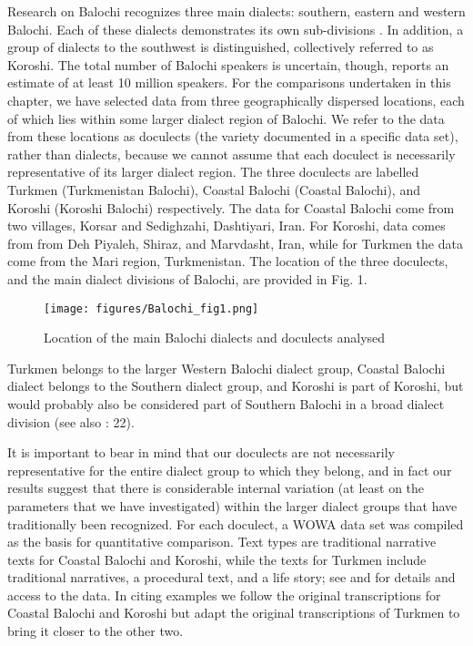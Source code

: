 \documentclass[output=paper,colorlinks,citecolor=brown,draftmode]{langscibook}
\begin{document}
Research on Balochi recognizes three main dialects: southern, eastern and western Balochi. Each of these dialects demonstrates its own sub-divisions \citep[see][636--637]{jahani_balochi_2009}. In addition, a group of dialects to the southwest is distinguished, collectively referred to as Koroshi. The total number of Balochi speakers is uncertain, though, \citet{jahani_balochi_2013} reports an estimate of at least 10 million speakers. For the comparisons undertaken in this chapter, we have selected data from three geographically dispersed locations, each of which lies within some larger dialect region of Balochi. We refer to the data from these locations as doculects (the variety documented in a specific data set), rather than dialects, because we cannot assume that each doculect is necessarily representative of its larger dialect region. The three doculects are labelled Turkmen (Turkmenistan Balochi), Coastal Balochi (Coastal Balochi), and Koroshi (Koroshi Balochi) respectively. The data for Coastal Balochi come from two villages, Korsar and Sedighzahi, Dashtiyari, Iran. For Koroshi, data comes from from Deh Piyaleh, Shiraz, and Marvdasht, Iran, while for Turkmen the data come from the Mari region, Turkmenistan. The location of the three doculects, and the main dialect divisions of Balochi, are provided in Fig. 1.

\begin{figure}
 \centering
 \texttt{[image: figures/Balochi\_fig1.png]}
 \caption{Location of the main Balochi dialects and doculects analysed}
 \label{Balochi:fig:1}
\end{figure}

Turkmen belongs to the larger Western Balochi dialect group, Coastal Balochi dialect belongs to the Southern dialect group, and Koroshi is part of Koroshi, but would probably also be considered part of Southern Balochi in a broad dialect division (see also \citealt{nourzaei_koroshi_2015}: 22). 

It is important to bear in mind that our doculects are not necessarily representative for the entire dialect group to which they belong, and in fact our results suggest that there is considerable internal variation (at least on the  parameters that we have investigated) within the larger dialect groups that have traditionally been recognized. For each doculect, a WOWA data set was compiled as the basis for quantitative comparison. Text types are traditional narrative texts for Coastal Balochi and Koroshi, while the texts for Turkmen include traditional narratives, a procedural text, and a life story; see \citet{nourzaei_balochi_coastal_2021,nourzaei_balochi_koroshi_2021} and \citet{haig_balochi_2022} for details and access to the data. In citing examples we follow the original transcriptions for Coastal Balochi and Koroshi but adapt the original transcriptions of Turkmen to bring it closer to the other two.
\end{document}
